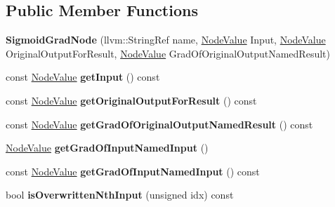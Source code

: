 \subsection*{Public Member Functions}
\begin{DoxyCompactItemize}
\item 
\mbox{\label{classglow_1_1_sigmoid_grad_node_aaf4388c7b142cbef5dad38f18ac3eecd}} 
{\bfseries Sigmoid\+Grad\+Node} (llvm\+::\+String\+Ref name, \hyperlink{structglow_1_1_node_value}{Node\+Value} Input, \hyperlink{structglow_1_1_node_value}{Node\+Value} Original\+Output\+For\+Result, \hyperlink{structglow_1_1_node_value}{Node\+Value} Grad\+Of\+Original\+Output\+Named\+Result)
\item 
\mbox{\label{classglow_1_1_sigmoid_grad_node_ad7fdeaec3e17456bef325016126fd364}} 
const \hyperlink{structglow_1_1_node_value}{Node\+Value} {\bfseries get\+Input} () const
\item 
\mbox{\label{classglow_1_1_sigmoid_grad_node_a759caf07911604ebe442c7462045e7cd}} 
const \hyperlink{structglow_1_1_node_value}{Node\+Value} {\bfseries get\+Original\+Output\+For\+Result} () const
\item 
\mbox{\label{classglow_1_1_sigmoid_grad_node_ae7d2653cc9f69f749a49c182f8c610fd}} 
const \hyperlink{structglow_1_1_node_value}{Node\+Value} {\bfseries get\+Grad\+Of\+Original\+Output\+Named\+Result} () const
\item 
\mbox{\label{classglow_1_1_sigmoid_grad_node_af3282ce751d0f59844331346dc3307ad}} 
\hyperlink{structglow_1_1_node_value}{Node\+Value} {\bfseries get\+Grad\+Of\+Input\+Named\+Input} ()
\item 
\mbox{\label{classglow_1_1_sigmoid_grad_node_aaf88c5e2f2bc879839a2ff4ee38ff801}} 
const \hyperlink{structglow_1_1_node_value}{Node\+Value} {\bfseries get\+Grad\+Of\+Input\+Named\+Input} () const
\item 
\mbox{\label{classglow_1_1_sigmoid_grad_node_acc6d085c405ff80445aed695721b66be}} 
bool {\bfseries is\+Overwritten\+Nth\+Input} (unsigned idx) const

\end{DoxyCompactItemize}

